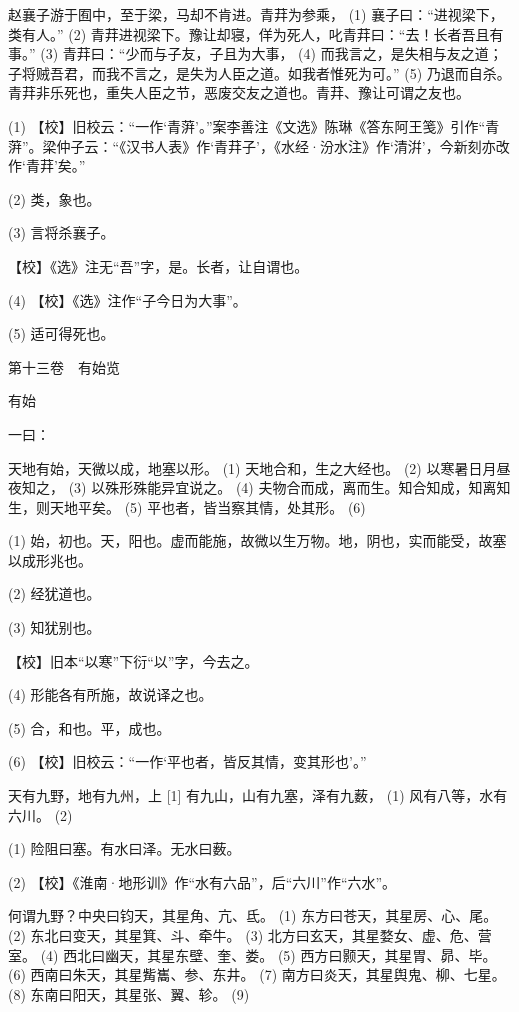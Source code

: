 \documentclass[12pt,UTF8]{ctexbook}
\begin{document}
赵襄子游于囿中，至于梁，马却不肯进。青荓为参乘， (1) 襄子曰：“进视梁下，类有人。” (2) 青荓进视梁下。豫让却寝，佯为死人，叱青荓曰：“去！长者吾且有事。” (3) 青荓曰：“少而与子友，子且为大事， (4) 而我言之，是失相与友之道；子将贼吾君，而我不言之，是失为人臣之道。如我者惟死为可。” (5) 乃退而自杀。青荓非乐死也，重失人臣之节，恶废交友之道也。青荓、豫让可谓之友也。

(1) 【校】旧校云：“一作‘青蓱’。”案李善注《文选》陈琳《答东阿王笺》引作“青蓱”。梁仲子云：“《汉书人表》作‘青荓子’，《水经·汾水注》作‘清洴’，今新刻亦改作‘青荓’矣。”

(2) 类，象也。

(3) 言将杀襄子。

【校】《选》注无“吾”字，是。长者，让自谓也。

(4) 【校】《选》注作“子今日为大事”。

(5) 适可得死也。





第十三卷　有始览



有始


一曰：

天地有始，天微以成，地塞以形。 (1) 天地合和，生之大经也。 (2) 以寒暑日月昼夜知之， (3) 以殊形殊能异宜说之。 (4) 夫物合而成，离而生。知合知成，知离知生，则天地平矣。 (5) 平也者，皆当察其情，处其形。 (6)

(1) 始，初也。天，阳也。虚而能施，故微以生万物。地，阴也，实而能受，故塞以成形兆也。

(2) 经犹道也。

(3) 知犹别也。

【校】旧本“以寒”下衍“以”字，今去之。

(4) 形能各有所施，故说译之也。

(5) 合，和也。平，成也。

(6) 【校】旧校云：“一作‘平也者，皆反其情，变其形也’。”

天有九野，地有九州，上 [1] 有九山，山有九塞，泽有九薮， (1) 风有八等，水有六川。 (2)

(1) 险阻曰塞。有水曰泽。无水曰薮。

(2) 【校】《淮南·地形训》作“水有六品”，后“六川”作“六水”。

何谓九野？中央曰钧天，其星角、亢、氐。 (1) 东方曰苍天，其星房、心、尾。 (2) 东北曰变天，其星箕、斗、牵牛。 (3) 北方曰玄天，其星婺女、虚、危、营室。 (4) 西北曰幽天，其星东壁、奎、娄。 (5) 西方曰颢天，其星胃、昴、毕。 (6) 西南曰朱天，其星觜巂、参、东井。 (7) 南方曰炎天，其星舆鬼、柳、七星。 (8) 东南曰阳天，其星张、翼、轸。 (9)
\end{document}
